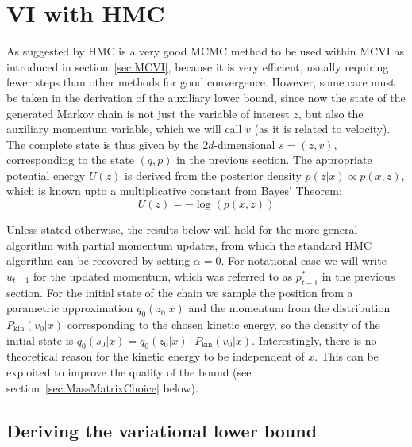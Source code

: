 \section{VI with HMC}
\label{sec:HMCVI}
As suggested by \textcite{Salimans2014} HMC is a very good MCMC method to be used within MCVI as introduced in section~\ref{sec:MCVI}, because it is very efficient, usually requiring fewer steps than other methods for good convergence. However, some care must be taken in the derivation of the auxiliary lower bound, since now the state of the generated Markov chain is not just the variable of interest $z$, but also the auxiliary momentum variable, which we will call $v$ (as it is related to velocity). The complete state is thus given by the $2d$-dimensional $s=(z, v)$, corresponding to the state $(q, p)$ in the previous section. The appropriate potential energy $U(z)$ is derived from the posterior density $p(z|x) \propto p(x, z)$, which is known upto a multiplicative constant from Bayes' Theorem:
\begin{equation} \label{eq:VIwithHMCPotEnergy}
U(z) = -\log(p(x, z))
\end{equation}

Unless stated otherwise, the results below will hold for the more general algorithm with partial momentum updates, from which the standard HMC algorithm can be recovered by setting $\alpha = 0$. For notational ease we will write $u_{t-1}$ for the updated momentum, which was referred to as $p^*_{t-1}$ in the previous section.
\label{sec:KinEnergyMayDependOnX}
For the initial state of the chain we sample the position from a parametric approximation $q_0(z_0|x)$ and the momentum from the distribution $P_\textrm{kin}(v_0|x)$ corresponding to the chosen kinetic energy, so the density of the initial state is $q_0(s_0|x)=q_0(z_0|x) \cdot P_\textrm{kin}(v_0|x)$. Interestingly, there is no theoretical reason for the kinetic energy to be independent of $x$. This can be exploited to improve the quality of the bound (see section~\ref{sec:MassMatrixChoice} below).

\subsection{Deriving the variational lower bound}

